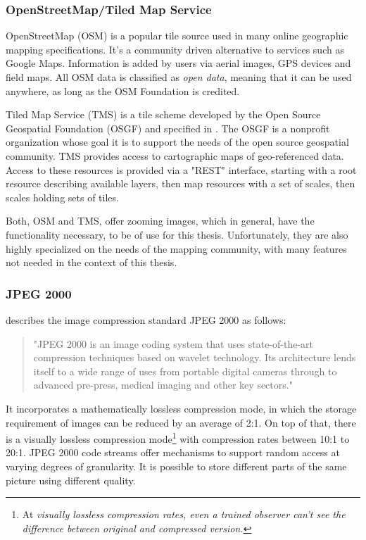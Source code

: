 \subsubsection{OpenStreetMap/Tiled Map Service}
OpenStreetMap (OSM) is a popular tile source used in many online geographic mapping specifications\cite{web:openseadragon}. It's a community driven alternative to services such as Google Maps. Information is added by users via aerial images, GPS devices and field maps. All OSM data is classified as \emph{open data}, meaning that it can be used anywhere, as long as the OSM Foundation is credited\cite{web:osm}.

Tiled Map Service (TMS) is a tile scheme developed by the Open Source Geospatial Foundation (OSGF)\cite{web:openseadragon} and specified in \cite{web:tms}. The OSGF is a nonprofit organization whose goal it is to support the needs of the open source geospatial community. TMS provides access to cartographic maps of geo-referenced data. Access to these resources is provided via a "REST" interface, starting with a root resource describing available layers, then map resources with a set of scales, then scales holding sets of tiles\cite{web:tms}.

Both, OSM and TMS, offer zooming images, which in general, have the functionality necessary, to be of use for this thesis. Unfortunately, they are also highly specialized on the needs of the mapping community, with many features not needed in the context of this thesis.


\subsubsection{JPEG 2000}
\cite{web:jpeg2000} describes the image compression standard JPEG 2000 as follows:
\begin{quotation}
	"JPEG 2000 is an image coding system that uses state-of-the-art compression techniques based on wavelet technology. Its architecture lends itself to a wide range of uses from portable digital cameras through to advanced pre-press, medical imaging and other key sectors."
\end{quotation}

It incorporates a mathematically lossless compression mode, in which the storage requirement of images can be reduced by an average of 2:1. On top of that, there is a visually lossless compression mode\footnote{At \emph{visually lossless compression rates, even a trained observer can't see the difference between original and compressed version\cite{intoPix08}.}} with compression rates between 10:1 to 20:1\cite{intoPix08}. JPEG 2000 code streams offer mechanisms to support random access at varying degrees of granularity. It is possible to store different parts of the same picture using different quality\cite{Taubmann01}. 

